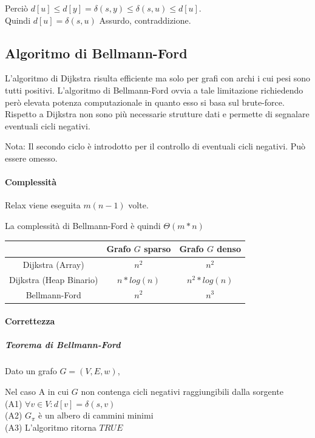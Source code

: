 \documentclass[tikz]{article}
\let\oldparagraph\paragraph
\renewcommand{\paragraph}[1]{\oldparagraph{#1}\mbox{}}
\let\oldsubparagraph\subparagraph
\renewcommand{\subparagraph}[1]{\oldsubparagraph{#1}\mbox{}}
\begin{document}
{{Perciò $d[u] \leq d[y] = \delta(s,y) \leq \delta(s,u) \leq d[u]$. \\ Quindi $d[u]= \delta(s,u)$ Assurdo, contraddizione.


\subsection{Algoritmo di Bellmann-Ford}

{L'algoritmo di Dijkstra risulta efficiente ma solo per grafi con archi i cui pesi sono tutti positivi. L'algoritmo di Bellmann-Ford ovvia a tale limitazione richiedendo però elevata potenza computazionale in quanto esso si basa sul brute-force. Rispetto a Dijkstra non sono più necessarie strutture dati e permette di segnalare eventuali cicli negativi.}



Nota: Il secondo ciclo è introdotto per il controllo di eventuali cicli negativi. Può essere omesso.

\paragraph{Complessità}

Relax viene eseguita $m(n-1)$ volte.

La complessità di Bellmann-Ford è quindi $\Theta(m*n)$

\begin{tabular}{|c|c|c|}
\hline 
  & Grafo $G$ sparso & Grafo $G$ denso \\ 
\hline 
Dijkstra (Array) & $n^2$ & $n^2$ \\ 
\hline 
Dijkstra (Heap Binario) & $n*log(n)$ & $n^2*log(n)$ \\ 
\hline 
Bellmann-Ford & $n^2$ & $n^3$ \\ 
\hline 
\end{tabular} 

\paragraph{Correttezza}

\subparagraph{Teorema di Bellmann-Ford}

Dato un grafo $G=(V,E,w)$, 

Nel caso A in cui $G$ non contenga cicli negativi raggiungibili dalla sorgente\\
(A1) $\forall v \in V : d[v] = \delta(s,v)$ \\
(A2) $G_\pi$ è un albero di cammini minimi\\
(A3) L'algoritmo ritorna $TRUE$

}}
\end{document}

